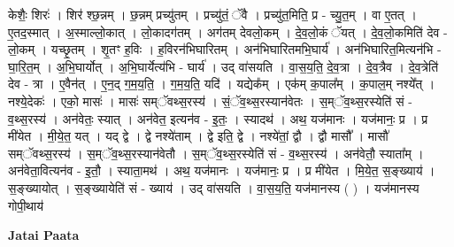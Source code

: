 \documentclass[17pt]{extarticle}
\begin{document}
केशैः॒ शिरः॑ । शिर॑ श्छ॒न्नम् । छ॒न्नम् प्रच्यु॑तम् । प्रच्यु॑तं॒ ॅवै । प्रच्यु॑त॒मिति॒ प्र - च्यु॒त॒म् । वा ए॒तत् । ए॒तद॒स्मात् । अ॒स्माल्लो॒कात् । लो॒कादग॑तम् । अग॑तम् देवलो॒कम् । दे॒व॒लो॒कं ॅयत् । दे॒व॒लो॒कमिति॑ देव - लो॒कम् । यच्छृ॒तम् । शृ॒तꣳ ह॒विः । ह॒विरन॑भिघारितम् । अन॑भिघारितमभि॒घार्य॑ । अन॑भिघारित॒मित्यन॑भि - घा॒रि॒त॒म् । अ॒भि॒घार्योत् । अ॒भि॒घार्येत्य॑भि - घार्य॑ । 
उद् वा॑सयति । वा॒स॒य॒ति॒ दे॒व॒त्रा । दे॒व॒त्रैव । दे॒व॒त्रेति॑ देव - त्रा । ए॒वैन॑त् । 
ए॒न॒द् ग॒म॒य॒ति॒ । ग॒म॒य॒ति॒ यदि॑ । यद्येक᳚म् । एक॑म् क॒पाल᳚म् । क॒पाल॒म् नश्ये᳚त् । नश्ये॒देकः॑ । एको॒ मासः॑ । मासः॑ सम्ॅवथ्स॒रस्य॑ । सं॒ॅव॒थ्स॒रस्यान॑वेतः । स॒म्ॅव॒थ्स॒रस्येति॑ सं - व॒थ्स॒रस्य॑ । अन॑वेतः॒ स्यात् । अन॑वेत॒ इत्यन॑व - इ॒तः॒ । स्यादथ॑ । अथ॒ यज॑मानः । यज॑मानः॒ प्र । प्र मी॑येत । मी॒ये॒त॒ यत् । यद् द्वे । द्वे नश्ये॑ताम् । द्वे इति॒ द्वे । नश्ये॑तां॒ द्वौ । द्वौ मासौ᳚ । मासौ॑ सम्ॅवथ्स॒रस्य॑ । स॒म्ॅव॒थ्स॒रस्यान॑वेतौ । स॒म्ॅव॒थ्स॒रस्येति॑ सं - व॒थ्स॒रस्य॑ । अन॑वेतौ॒ स्याता᳚म् । अन॑वेता॒वित्यन॑व - इ॒तौ॒ । स्याता॒मथ॑ । अथ॒ यज॑मानः । यज॑मानः॒ प्र । प्र मी॑येत । मि॒ये॒त॒ स॒ङ्ख्याय॑ । स॒ङ्ख्यायोत् । स॒ङ्ख्यायेति॑ सं - ख्याय॑ । उद् वा॑सयति । वा॒स॒य॒ति॒ यज॑मानस्य ( ) । यज॑मानस्य गोपी॒थाय॑ \newline

\textbf{Jatai Paata} \newline
\end{document}
